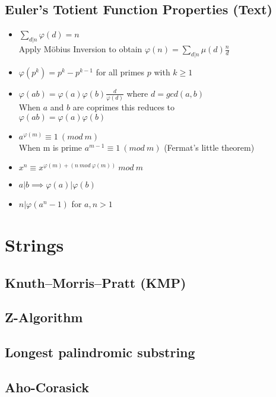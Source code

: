 \documentclass[9pt]{extarticle}
\begin{document}
\begin{multicols*}{3}
\subsection{Euler's Totient Function Properties (Text)}
\begin{itemize}
\item $\displaystyle \sum_{d|n} \varphi(d) = n$ \\
Apply M\"obius Inversion to obtain $\displaystyle \varphi(n) = \sum_{d|n} \mu(d)\frac{n}{d}$
\item $\varphi(p^k) = p^k - p^{k-1}$ for all primes $p$ with $k \geq 1$
\item $\varphi(ab) = \varphi(a)\varphi(b)\frac{d}{\varphi(d)}$ where $d = gcd(a, b)$ \\
When $a$ and $b$ are coprimes this reduces to \\
$\varphi(ab) = \varphi(a)\varphi(b)$
\item $a^{\varphi(m)} \equiv 1 \ (mod \ m)$ \\
When m is prime $a^{m-1} \equiv 1 \ (mod \ m)$ (Fermat's little theorem)
\item $x^n \equiv x^{\varphi(m) + (n \ mod \ \varphi(m))} \ mod \ m$
\item $a | b \implies \varphi(a) | \varphi(b)$
\item $n | \varphi(a^n - 1)$ for $a, n > 1$
\end{itemize}

\section{Strings}

\subsection{Knuth--Morris--Pratt (KMP)}


\subsection{Z-Algorithm}


\subsection{Longest palindromic substring} %


\subsection{Aho-Corasick}



\end{multicols*}
\end{document}
